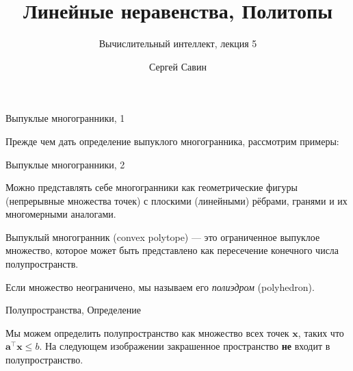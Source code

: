 \documentclass{beamer}
\title{Линейные неравенства, Политопы}
\subtitle{Вычислительный интеллект, лекция 5}
\author{Сергей Савин}
\date{\mydate}
\begin{document}
\maketitle

%	
%	



\begin{frame}{Выпуклые многогранники, 1}
	\begin{flushleft}
		
		Прежде чем дать определение выпуклого многогранника, рассмотрим примеры:
		
		
		
	\end{flushleft}
\end{frame}


\begin{frame}{Выпуклые многогранники, 2}
	\begin{flushleft}
		
		Можно представлять себе многогранники как геометрические фигуры (непрерывные множества точек) с плоскими (линейными) рёбрами, гранями и их многомерными аналогами.
		
		\bigskip
		
		\begin{definition}
			Выпуклый многогранник (convex polytope) — это ограниченное выпуклое множество, которое может быть представлено как пересечение конечного числа полупространств.
		\end{definition}
		
		\bigskip
		
		Если множество неограничено, мы называем его \emph{полиэдром} (polyhedron).
		
	\end{flushleft}
\end{frame}


\begin{frame}{Полупространства, Определение}
	\begin{flushleft}
		
		Мы можем определить полупространство как множество всех точек $\mathbf{x}$, таких что $\mathbf{a}^\top \mathbf{x} \leq b$. На следующем изображении закрашенное пространство \textbf{не} входит в полупространство.
		
		
		
	\end{flushleft}
\end{frame}
\end{document}
